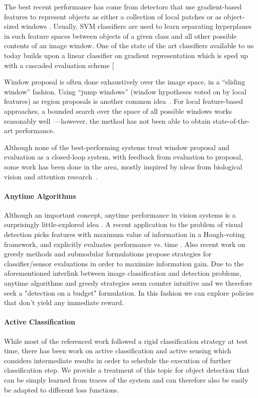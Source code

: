 The best recent performance has come from detectors that use gradient-based features to represent objects as either a collection of local patches or as object-sized windows \cite{Dalal2005,Lowe2004}.
Usually, SVM classifiers are used to learn separating hyperplanes in such feature spaces between objects of a given class and all other possible contents of an image window. One of the state of the art classifiers available to us today builds upon a linear classifier on gradient representation which is sped up with a cascaded evaluation scheme \cite{DPM-cascade}[

Window proposal is often done exhaustively over the image space, in a ``sliding window'' fashion.
Using ``jump windows'' (window hypotheses voted on by local features) as region proposals is another common idea~\cite{Chum2007b,Vedaldi2009,Vijayanarasimhan2011}.
For local feature-based approaches, a bounded search over the space of all possible windows works reasonably well~\cite{Lampert2008b}---however, the method has not been able to obtain state-of-the-art performance.

Although none of the best-performing systems treat window proposal and evaluation as a closed-loop system, with feedback from evaluation to proposal, some work has been done in the area, mostly inspired by ideas from biological vision and attention research~\cite{Butko2009,Vogel2008,Paletta2005}.

\paragraph{Anytime Algorithms}
Although an important concept, anytime performance in vision systems is a surprisingly little-explored idea \cite{Shlomo Zilberstein}.
A recent application to the problem of visual detection picks features with maximum value of information in a Hough-voting framework, and explicitly evaluates performance vs. time \cite{Vijayanarasimhan2010}. 
Also recent work on greedy methods and submodular formulations propose strategies for classifier/sensor evaluations in order to maximize information gain. Due to the aforementioned interlink between image classification and detection problems, anytime algorithms and greedy strategies seem counter intuitive and we therefore seek a "detection on a budget" formulation. In this fashion we can explore policies that don't yield any immediate reward.

\paragraph{Active Classification}
While most of the referenced work followed a rigid classification strategy at test time, there has been work on active classification \cite{Active Classification based on Value of Classifier}
 and active sensing  \cite{active sensing} which considers intermediate results in order to schedule the execution of further classification step. We provide a treatment of this topic for object detection that can be simply learned from traces of the system and can therefore also be easily be adapted to different loss functions.


